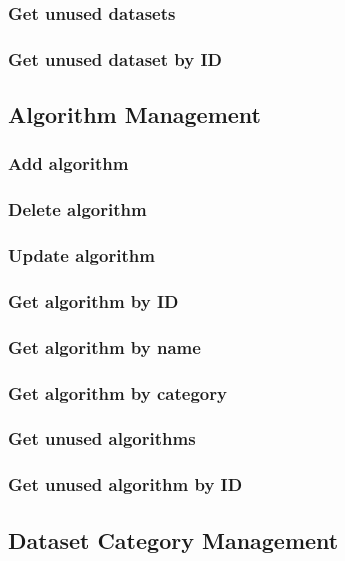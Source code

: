 \subsubsection {Get unused datasets}
\subsubsection {Get unused dataset by ID}

\subsection{Algorithm Management}

\subsubsection {Add algorithm}
\subsubsection {Delete algorithm}
\subsubsection {Update algorithm}
\subsubsection {Get algorithm by ID}
\subsubsection {Get algorithm by name}
\subsubsection {Get algorithm by category}
\subsubsection {Get unused algorithms}
\subsubsection {Get unused algorithm by ID}

\subsection{Dataset Category Management}

